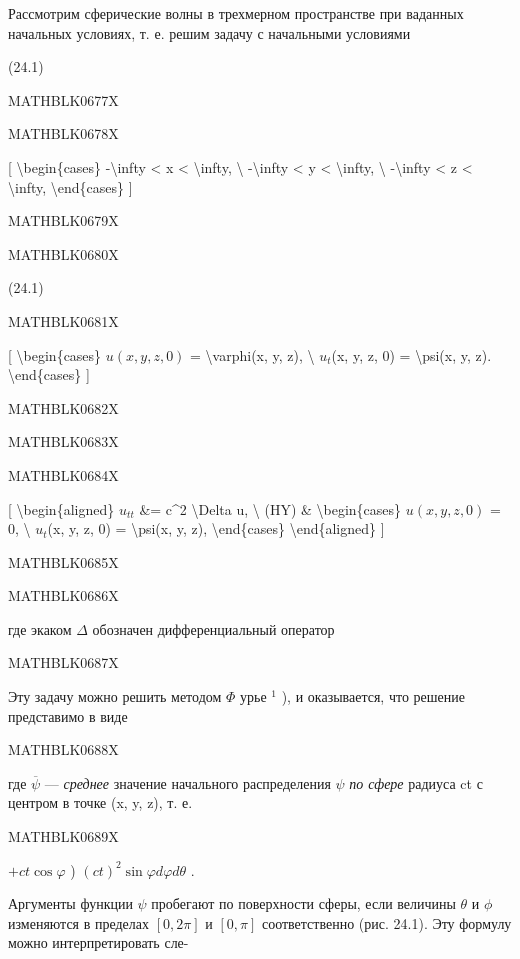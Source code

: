 \documentclass[
]{article}
\begin{document}
{{Рассмотрим сферические волны в трехмерном пространстве при ваданных
начальных условиях, т. е. решим задачу с начальными условиями

(24.1)

MATHBLK0677X

MATHBLK0678X

{[} \textbackslash begin\{cases\} -\textbackslash infty \textless{} x
\textless{} \textbackslash infty, \textbackslash{} -\textbackslash infty
\textless{} y \textless{} \textbackslash infty, \textbackslash{}
-\textbackslash infty \textless{} z \textless{} \textbackslash infty,
\textbackslash end\{cases\} {]}

MATHBLK0679X

MATHBLK0680X

(24.1)

MATHBLK0681X

{[} \textbackslash begin\{cases\} \(u(x, y, z, 0)\) =
\textbackslash varphi(x, y, z), \textbackslash{} \(u_{t}\)(x, y, z, 0) =
\textbackslash psi(x, y, z). \textbackslash end\{cases\} {]}

MATHBLK0682X

MATHBLK0683X

MATHBLK0684X

{[} \textbackslash begin\{aligned\} \(u_{tt}\) \&= c\^{}2
\textbackslash Delta u, \textbackslash{} (HY) \&
\textbackslash begin\{cases\} \(u(x, y, z, 0)\) = 0, \textbackslash{}
\(u_t\)(x, y, z, 0) = \textbackslash psi(x, y, z),
\textbackslash end\{cases\} \textbackslash end\{aligned\} {]}

MATHBLK0685X

MATHBLK0686X

где экаком \(\Delta\) обозначен дифференциальный оператор

MATHBLK0687X

Эту задачу можно решить методом \(\Phi\) урье \(^{1}\) ), и оказывается,
что решение представимо в виде

MATHBLK0688X

где \(\overline{\psi}\) --- \emph{среднее} значение начального
распределения \(\psi\) \emph{по сфере} радиуса ct с центром в точке (x,
y, z), т. е.

MATHBLK0689X

\(+ ct \cos \varphi\) ) \((ct)^2 \sin \varphi d\varphi d\theta\) .

Аргументы функции \(\psi\) пробегают по поверхности сферы, если величины
\(\theta\) и \(\phi\) изменяются в пределах \([0, 2\pi]\) и \([0, \pi]\)
соответственно (рис. 24.1). Эту формулу можно интерпретировать сле-

}}
\end{document}
